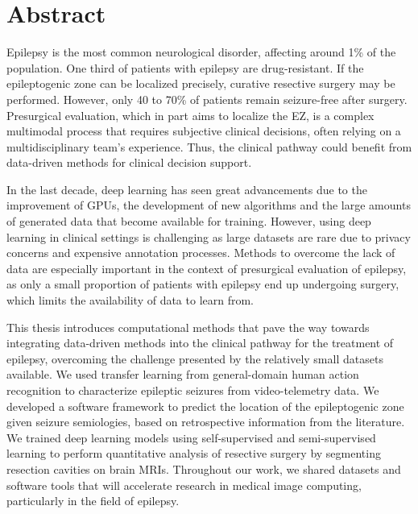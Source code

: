\chapter{Abstract}


Epilepsy is the most common neurological disorder, affecting around 1\% of the population.
One third of patients with epilepsy are drug-resistant.
If the epileptogenic zone can be localized precisely, curative resective surgery may be performed.
However, only 40 to 70\% of patients remain seizure-free after surgery.
Presurgical evaluation, which in part aims to localize the \ac{EZ}, is a complex multimodal process that requires subjective clinical decisions, often relying on a multidisciplinary team's experience.
Thus, the clinical pathway could benefit from data-driven methods for clinical decision support.

In the last decade, deep learning has seen great advancements due to the improvement of \acp{GPU}, the development of new algorithms and the large amounts of generated data that become available for training.
However, using deep learning in clinical settings is challenging as large datasets are rare due to privacy concerns and expensive annotation processes.
Methods to overcome the lack of data are especially important in the context of presurgical evaluation of epilepsy, as only a small proportion of patients with epilepsy end up undergoing surgery, which limits the availability of data to learn from.

This thesis introduces computational methods that pave the way towards integrating data-driven methods into the clinical pathway for the treatment of epilepsy, overcoming the challenge presented by the relatively small datasets available.
We used transfer learning from general-domain human action recognition to characterize epileptic seizures from video-telemetry data.
We developed a software framework to predict the location of the epileptogenic zone given seizure semiologies, based on retrospective information from the literature.
We trained deep learning models using self-supervised and semi-supervised learning to perform quantitative analysis of resective surgery by segmenting resection cavities on brain \acp{MRI}.
Throughout our work, we shared datasets and software tools that will accelerate research in medical image computing, particularly in the field of epilepsy.
